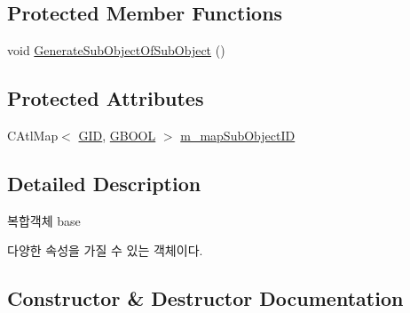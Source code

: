 \subsection*{Protected Member Functions}
\begin{DoxyCompactItemize}
\item 
void \hyperlink{class_c_g_compound_object_base_a29f6eeac42517b69b22368fa9369194e}{Generate\+Sub\+Object\+Of\+Sub\+Object} ()
\end{DoxyCompactItemize}
\subsection*{Protected Attributes}
\begin{DoxyCompactItemize}
\item 
C\+Atl\+Map$<$ \hyperlink{_g_types_8h_a5b96ecb16d8e437977d12cd40aa6f6d8}{G\+I\+D}, \hyperlink{_g_types_8h_a2901915743626352a6820c5405f556dc}{G\+B\+O\+O\+L} $>$ \hyperlink{class_c_g_compound_object_base_a7ac4b2bc46e79a61a0f2595d3b84e289}{m\+\_\+map\+Sub\+Object\+I\+D}
\end{DoxyCompactItemize}


\subsection{Detailed Description}

\begin{DoxyItemize}
\item 복합객체 base
\item 다양한 속성을 가질 수 있는 객체이다. 
\end{DoxyItemize}

\subsection{Constructor \& Destructor Documentation}
\hypertarget{class_c_g_compound_object_base_a7f674fc0fc64f4923ea6781041eb13e0}{}
